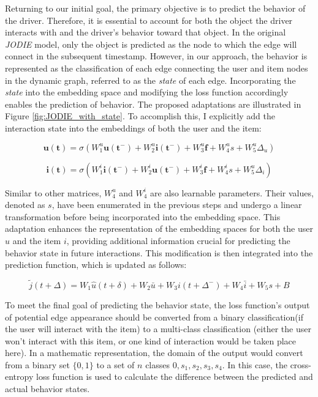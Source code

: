Returning to our initial goal, the primary objective is to predict the behavior of the driver. Therefore, it is essential to account for both the object the driver interacts with and the driver’s behavior toward that object. In the original \textit{JODIE} model, only the object is predicted as the node to which the edge will connect in the subsequent timestamp. However, in our approach, the behavior is represented as the classification of each edge connecting the user and item nodes in the dynamic graph, referred to as the \textit{state} of each edge. Incorporating the \textit{state} into the embedding space and modifying the loss function accordingly enables the prediction of behavior. The proposed adaptations are illustrated in Figure \ref{fig:JODIE_with_state}. To accomplish this, I explicitly add the interaction state into the embeddings of both the user and the item: 


\[ \mathbf{u(t)} = \sigma (W_1^u \mathbf{u(t^-)} + W_2^u \mathbf{i(t^-)} + W_3^u \mathbf{f} + W^u_4s+W^u_5\Delta _u) \]

\[ \mathbf{i(t)} = \sigma (W_1^i \mathbf{i(t^-)} + W_2^i \mathbf{u(t^-)} + W_3^i \mathbf{f} + W^i_4s+W^u_5 \Delta _i) \]


Similar to other matrices, $W^u_4$ and $W^i_4$ are also learnable parameters. Their values, denoted as $s$, have been enumerated in the previous steps and undergo a linear transformation before being incorporated into the embedding space. This adaptation enhances the representation of the embedding spaces for both the user $u$ and the item $i$, providing additional information crucial for predicting the behavior state in future interactions. This modification is then integrated into the prediction function, which is updated as follows:

\[ \tilde{j}(t+\Delta)=W_1\hat{u}(t+\delta)+W_2\bar{u}+W_3i(t+\Delta ^-)+W_4\bar{i}+W_5s+B \]

To meet the final goal of predicting the behavior state, the loss function's output  of potential edge appearance should be converted from a binary classification(if the user will interact with the item) to a multi-class classification (either the user won't interact with this item, or one kind of interaction would be taken place here). In a mathematic representation, the domain of the output would convert from a binary set $\{0,1\}$ to a set of $n$ classes ${0,s_1,s_2,s_3,s_4}$. In this case, the cross-entropy loss function is used to calculate the difference between the predicted and actual behavior states. 



